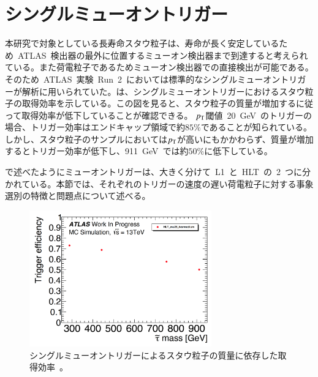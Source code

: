 \section{シングルミューオントリガー}
\label{sec:single}
本研究で対象としている長寿命スタウ粒子は、寿命が長く安定しているため~ATLAS~検出器の最外に位置するミューオン検出器まで到達すると考えられている。また荷電粒子であるためミューオン検出器での直接検出が可能である。そのため~ATLAS~実験~Run~2~においては標準的なシングルミューオントリガーが解析に用いられていた。は、シングルミューオントリガーにおけるスタウ粒子の取得効率を示している。この図を見ると、スタウ粒子の質量が増加するに従って取得効率が低下していることが確認できる。
$p_{\rm{T}}$閾値~20~GeV~のトリガーの場合、トリガー効率はエンドキャップ領域で約$85\%$であることが知られている。しかし、スタウ粒子のサンプルにおいては$p_{\rm{T}}$が高いにもかかわらず、質量が増加するとトリガー効率が低下し、911~GeV~では約$50\%$に低下している。

で述べたようにミューオントリガーは、大きく分けて~L1~と~HLT~の~2~つに分かれている。本節では、それぞれのトリガーの速度の遅い荷電粒子に対する事象選別の特徴と問題点について述べる。

\begin{figure}[H]
        \centering   
        \includegraphics[width=0.7\textwidth,page=1]{img/pdf3/sumi.pdf}
        \caption[シングルミューオントリガーによるスタウ粒子の質量に依存した取得効率]{シングルミューオントリガーによるスタウ粒子の質量に依存した取得効率~\cite{MT:01}。}
        \label{fig:sumi1}
\end{figure}

